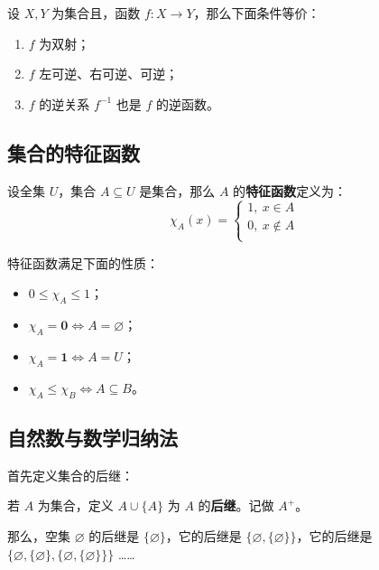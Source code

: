 \begin{theorem}
    设 $X, Y$ 为集合且，函数 $f: X \to Y$，那么下面条件等价：
    \begin{enumerate}
        \item $f$ 为双射；
        \item $f$ 左可逆、右可逆、可逆；
        \item $f$ 的逆关系 $f^{-1}$ 也是 $f$ 的逆函数。
    \end{enumerate}
\end{theorem}

\subsection{集合的特征函数}

\begin{definition}[特征函数]
    设全集 $U$，集合 $A \subseteq U$ 是集合，那么 $A$ 的\textbf{特征函数}定义为：
    $$
    \chi_{A}(x) = \begin{cases}
        1,\ x \in A \\
        0,\ x \notin A \\
    \end{cases}
    $$
\end{definition}

特征函数满足下面的性质：

\begin{itemize}
    \item $0 \le \chi_A \le 1$；
    \item $\chi_A = \mathbf{0} \iff A = \varnothing$；
    \item $\chi_A = \mathbf{1} \iff A = U$；
    \item $\chi_A \le \chi_B \iff A \subseteq B$。
\end{itemize}

\subsection{自然数与数学归纳法}

首先定义集合的后继：

\begin{definition}[后继]
    若 $A$ 为集合，定义 $A \cup \{A\}$ 为 $A$ 的\textbf{后继}。记做 $A^{+}$。
\end{definition}

那么，空集 $\varnothing$ 的后继是 $\{\varnothing\}$，它的后继是 $\{\varnothing, \{\varnothing\}\}$，它的后继是 $\{\varnothing, \{\varnothing\}, \{\varnothing, \{\varnothing\}\}\}$ ……

